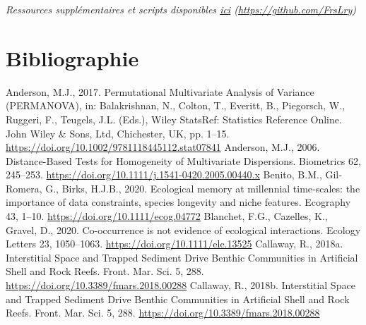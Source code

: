 \documentclass[12pt]{report}
\begin{document}
\textit{
Ressources supplémentaires et scripts disponibles \href{https://github.com/FrsLry/Projet_Ifremer}{ici}
(\href{https://github.com/FrsLry/Projet_Ifremer}{https://github.com/FrsLry})
}


\endgroup %

\chapter{Bibliographie}

\begin{singlespacing}

Anderson, M.J., 2017. Permutational Multivariate Analysis of Variance (PERMANOVA), in: Balakrishnan, N., Colton, T., Everitt, B., Piegorsch, W., Ruggeri, F., Teugels, J.L. (Eds.), Wiley StatsRef: Statistics Reference Online. John Wiley \& Sons, Ltd, Chichester, UK, pp. 1–15.\newline 
\href{https://doi.org/10.1002/9781118445112.stat07841}{https://doi.org/10.1002/9781118445112.stat07841}
\newline \newline
Anderson, M.J., 2006. Distance-Based Tests for Homogeneity of Multivariate Dispersions. Biometrics 62, 245–253. \href{https://doi.org/10.1111/j.1541-0420.2005.00440.x}{https://doi.org/10.1111/j.1541-0420.2005.00440.x}
\newline\newline
Benito, B.M., Gil‐Romera, G., Birks, H.J.B., 2020. Ecological memory at millennial time‐scales: the importance of data constraints, species longevity and niche features. Ecography 43, 1–10. \href{https://doi.org/10.1111/ecog.04772}{https://doi.org/10.1111/ecog.04772}
\newline\newline
Blanchet, F.G., Cazelles, K., Gravel, D., 2020. Co-occurrence is not evidence of ecological interactions. Ecology Letters 23, 1050–1063. \href{https://doi.org/10.1111/ele.13525}{https://doi.org/10.1111/ele.13525}
\newline\newline
Callaway, R., 2018a. Interstitial Space and Trapped Sediment Drive Benthic Communities in Artificial Shell and Rock Reefs. Front. Mar. Sci. 5, 288. \href{https://doi.org/10.3389/fmars.2018.00288}{https://doi.org/10.3389/fmars.2018.00288}
\newline\newline
Callaway, R., 2018b. Interstitial Space and Trapped Sediment Drive Benthic Communities in Artificial Shell and Rock Reefs. Front. Mar. Sci. 5, 288. \href{https://doi.org/10.3389/fmars.2018.00288}{https://doi.org/10.3389/fmars.2018.00288}

\end{singlespacing}
\end{document}
